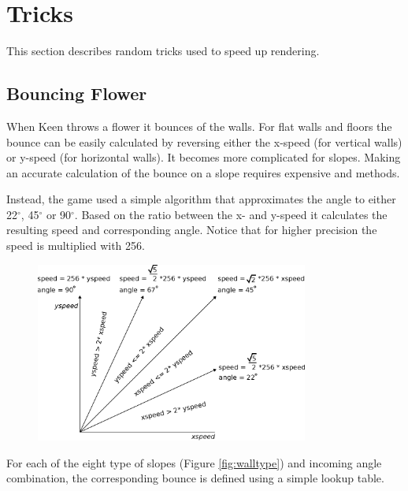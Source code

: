 \documentclass[book.tex]{subfiles}
\begin{document}
\section{Tricks}

This section describes random tricks used to speed up rendering. 




\subsection{Bouncing Flower}
When Keen throws a flower it bounces of the walls. For flat walls and floors the bounce can be easily calculated by reversing either the x-speed (for vertical walls) or y-speed (for horizontal walls). It becomes more complicated for slopes. Making an accurate calculation of the bounce on a slope requires expensive  and  methods. \\
\par
Instead, the game used a simple algorithm that approximates the angle to either 22$^{\circ}$, 45$^{\circ}$ or 90$^{\circ}$. Based on the ratio between the x- and y-speed it calculates the resulting speed and corresponding angle. Notice that for higher precision the speed is multiplied with 256.\\
\par
\begin{figure}[H]
\centering
\includegraphics[width=0.8\textwidth]{imgs/drawings/angle.eps}
\label{fig:angles}
\end{figure}
\par

For each of the eight type of slopes (Figure \ref{fig:walltype}) and incoming angle combination, the corresponding bounce is defined using a simple lookup table.\\

\par
\begin{minipage}{\textwidth}
  
\end{minipage}
\label{wallclip_array}
\par
\end{document}
